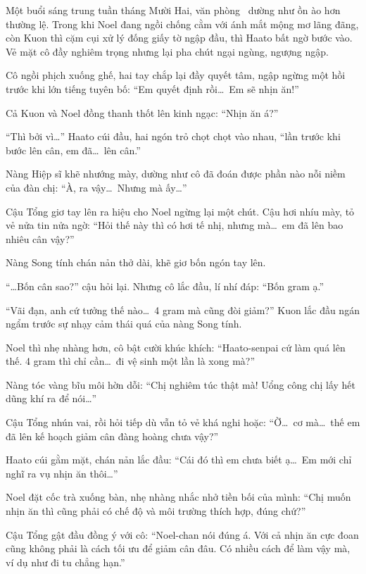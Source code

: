 \documentclass[../main.tex]{subfiles}
\begin{document}
Một buổi sáng trung tuần tháng Mười Hai, văn phòng \hll\ dường như ồn ào hơn thường lệ. Trong khi Noel đang ngồi chống cằm với ánh mắt mộng mơ lãng đãng, còn Kuon thì cặm cụi xử lý đống giấy tờ ngập đầu, thì Haato bất ngờ bước vào. Vẻ mặt cô đầy nghiêm trọng nhưng lại pha chút ngại ngùng, ngượng ngập.

Cô ngồi phịch xuống ghế, hai tay chắp lại đầy quyết tâm, ngập ngừng một hồi trước khi lớn tiếng tuyên bố: ``Em quyết định rồi\dots\ Em sẽ nhịn ăn!''

Cả Kuon và Noel đồng thanh thốt lên kinh ngạc: ``Nhịn ăn á?''

``Thì bởi vì\dots'' Haato cúi đầu, hai ngón trỏ chọt chọt vào nhau, ``lần trước khi bước lên cân, em đã\dots\ lên cân.''

Nàng Hiệp sĩ khẽ nhướng mày, dường như cô đã đoán được phần nào nỗi niềm của đàn chị: ``À, ra vậy\dots\ Nhưng mà ấy\dots''

Cậu Tổng giơ tay lên ra hiệu cho Noel ngừng lại một chút. Cậu hơi nhíu mày, tỏ vẻ nửa tin nửa ngờ: ``Hỏi thế này thì có hơi tế nhị, nhưng mà\dots\ em đã lên bao nhiêu cân vậy?''

Nàng Song tính chán nản thở dài, khẽ giơ bốn ngón tay lên.

``\dots Bốn cân sao?'' cậu hỏi lại. Nhưng cô lắc đầu, lí nhí đáp: ``Bốn gram ạ.''


``Vãi đạn, anh cứ tưởng thế nào\dots\ 4 gram mà cũng đòi giảm?'' Kuon lắc đầu ngán ngẩm trước sự nhạy cảm thái quá của nàng Song tính.

Noel thì nhẹ nhàng hơn, cô bật cười khúc khích: ``Haato-senpai cứ làm quá lên thế. 4 gram thì chỉ cần\dots\ đi vệ sinh một lần là xong mà?''

Nàng tóc vàng bĩu môi hờn dỗi: ``Chị nghiêm túc thật mà! Uổng công chị lấy hết dũng khí ra để nói\dots''

Cậu Tổng nhún vai, rồi hỏi tiếp dù vẫn tỏ vẻ khá nghi hoặc: ``Ờ\dots\ cơ mà\dots\ thế em đã lên kế hoạch giảm cân đàng hoàng chưa vậy?''

Haato cúi gằm mặt, chán nản lắc đầu: ``Cái đó thì em chưa biết ạ\dots\ Em mới chỉ nghĩ ra vụ nhịn ăn thôi\dots''

Noel đặt cốc trà xuống bàn, nhẹ nhàng nhắc nhở tiền bối của mình: ``Chị muốn nhịn ăn thì cũng phải có chế độ và môi trường thích hợp, đúng chứ?''

Cậu Tổng gật đầu đồng ý với cô: ``Noel-chan nói đúng á. Với cả nhịn ăn cực đoan cũng không phải là cách tối ưu để giảm cân đâu. Có nhiều cách để làm vậy mà, ví dụ như đi tu chẳng hạn.''
\end{document}

